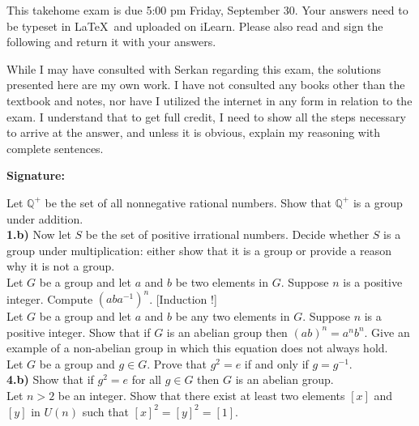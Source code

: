 \documentclass[11pt]{amsart}
\theoremstyle{definition}  %
\begin{document}

\noindent
This takehome exam is due 5:00 pm Friday, September 30. Your answers need to be typeset in \LaTeX \ and uploaded on iLearn. Please also read and sign the following and return it 
with your answers.

\vskip 3cm
\noindent While I may have consulted with Serkan regarding this exam, the solutions presented here are my own work. I have
not consulted any books other than the textbook and notes, nor  have I utilized the internet in any form in relation to the exam. I understand
that to get full credit, I need to show all the steps necessary to arrive at the answer, and unless it is obvious, explain 
my reasoning with complete sentences.


\vskip 1cm 
   \hspace{7cm}   {\bf Signature:}



\vfill
\eject

 Let $\mathbb{Q}^+$ be the set of all nonnegative rational numbers. Show that $\mathbb{Q}^+$ is a group under addition. \\
{\bf 1.b)} Now let $S$ be the set of positive irrational numbers. Decide whether $S$ is a group under multiplication: either show that it is a group or provide
a reason why it is not a group. \\

 Let $G$ be a group and let $a$ and $b$ be two elements in $G$. Suppose $n$ is a positive integer. Compute $(aba^{-1})^n$. [Induction !]\\


 Let $G$ be a group and let $a$ and $b$ be any two elements in $G$. Suppose $n$ is a positive integer. Show that if $G$ is an abelian group then  $(ab)^n = a^nb^n$.
Give an example of a non-abelian group in which this equation does not always hold. \\


 Let $G$ be a group and $g \in G$. Prove that $g^2 = e$ if and only if $g = g^{-1}$. \\
{\bf 4.b)} Show that if $g^2 = e$ for all $g \in G$ then $G$ is an abelian group. \\
  


 Let $n > 2$ be an integer. Show that there exist at least two elements $[x]$ and $[y]$ in $U(n)$ such that $[x]^2 = [y]^2 = [1]$. 
\end{document}
